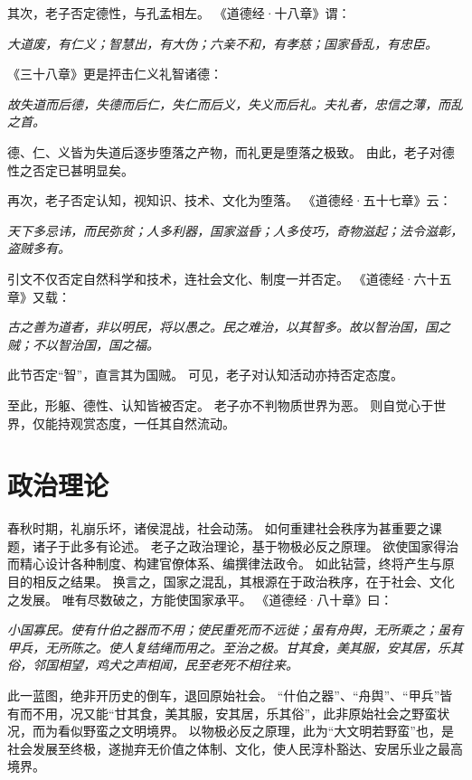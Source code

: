 \documentclass[11pt]{article}
\begin{document}
其次，老子否定德性，与孔孟相左。
《道德经·十八章》谓：

\textit{大道废，有仁义；智慧出，有大伪；六亲不和，有孝慈；国家昏乱，有忠臣。}

《三十八章》更是抨击仁义礼智诸德：

\textit{故失道而后德，失德而后仁，失仁而后义，失义而后礼。夫礼者，忠信之薄，而乱之首。}

德、仁、义皆为失道后逐步堕落之产物，而礼更是堕落之极致。
由此，老子对德性之否定已甚明显矣。

\newline

再次，老子否定认知，视知识、技术、文化为堕落。
《道德经·五十七章》云：

\textit{天下多忌讳，而民弥贫；人多利器，国家滋昏；人多伎巧，奇物滋起；法令滋彰，盗贼多有。}

引文不仅否定自然科学和技术，连社会文化、制度一并否定。
《道德经·六十五章》又载：

\textit{古之善为道者，非以明民，将以愚之。民之难治，以其智多。故以智治国，国之贼；不以智治国，国之福。}

此节否定“智”，直言其为国贼。
可见，老子对认知活动亦持否定态度。

\newline

至此，形躯、德性、认知皆被否定。
老子亦不判物质世界为恶。
则自觉心于世界，仅能持观赏态度，一任其自然流动。
  
\section{政治理论}
春秋时期，礼崩乐坏，诸侯混战，社会动荡。
如何重建社会秩序为甚重要之课题，诸子于此多有论述。
老子之政治理论，基于物极必反之原理。
欲使国家得治而精心设计各种制度、构建官僚体系、编撰律法政令。
如此钻营，终将产生与原目的相反之结果。
换言之，国家之混乱，其根源在于政治秩序，在于社会、文化之发展。
唯有尽数破之，方能使国家承平。
《道德经·八十章》曰：

\textit{小国寡民。使有什伯之器而不用；使民重死而不远徙；虽有舟舆，无所乘之；虽有甲兵，无所陈之。使人复结绳而用之。至治之极。甘其食，美其服，安其居，乐其俗，邻国相望，鸡犬之声相闻，民至老死不相往来。}

此一蓝图，绝非开历史的倒车，退回原始社会。
“什伯之器”、“舟舆”、“甲兵”皆有而不用，况又能“甘其食，美其服，安其居，乐其俗”，此非原始社会之野蛮状况，而为看似野蛮之文明境界。
以物极必反之原理，此为“大文明若野蛮”也，是社会发展至终极，遂抛弃无价值之体制、文化，使人民淳朴豁达、安居乐业之最高境界。
\end{document}
